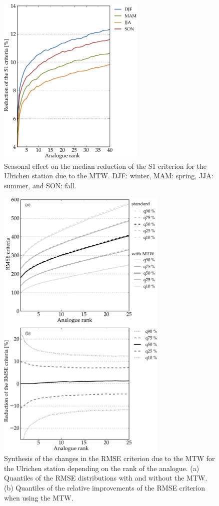 \documentclass[hess, manuscript]{copernicus}
\begin{document}
	\begin{figure}[htb]
		\begin{center}
			\includegraphics[width=7cm]{figures/changes_S1_seasons.pdf}
		\end{center}
		\caption{Seasonal effect on the median reduction of the S1 criterion for the Ulrichen station due to the MTW. DJF: winter, MAM: spring, JJA: summer, and SON: fall.}
		\label{fig:changes_S1_seasons}
	\end{figure}
	
	\begin{figure}[htb]
		\begin{center}
			\includegraphics[width=8.1cm]{figures/changes_RMSE_value_and_gain.pdf}
		\end{center}
		\caption{Synthesis of the changes in the RMSE criterion due to the MTW for the Ulrichen station depending on the rank of the analogue. (a) Quantiles of the RMSE distributions with and without the MTW. (b) Quantiles of the relative improvements of the RMSE criterion when using the MTW.}
		\label{fig:changes_RMSE}
	\end{figure}
	
\end{document}
